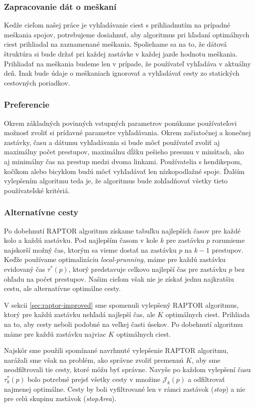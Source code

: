 \subsubsection{Zapracovanie dát o meškaní}
Kedže cieľom našej práce je vyhľadávanie ciest s prihliadnutím na prípadné meškania spojov, potrebujeme dosiahnuť, aby algoritmus pri hľadaní optimálnych ciest prihliadal na zaznamenané meškania. Spoliehame sa na to, že dátová štruktúra si bude držať pri každej zastávke v každej jazde hodnotu meškania. Prihliadať na meškania budeme len v prípade, že používateľ vyhľadáva v aktuálny deň. Inak bude údaje o meškaniach ignorovať a vyhľadávať cesty zo statických cestovných poriadkov.

\subsubsection{Preferencie}
Okrem základných povinných vstupných parametrov ponúkame používateľovi možnosť zvoliť si prídavné parametre vyhľadávania. Okrem začiatočnej a konečnej zastávky, času a dátumu vyhľadávania si bude môcť používateľ zvoliť aj maximálny počet prestupov, maximálnu dĺžku pešieho presunu v minútach, ako aj minimálny čas na prestup medzi dvoma linkami. Používatelia s hendikepom, kočíkom alebo bicyklom budú môcť vyhľadávať len nízkopodlažné spoje. Ďalším vylepšením algoritmu teda je, že algoritmus bude zohľadňovať všetky tieto používateľské kritériá. 

\subsubsection{Alternatívne cesty}
Po dobehnutí RAPTOR algoritmu získame tabuľku najlepších časov pre každé kolo a každú zastávku. Pod najlepším časom v kole $k$ pre zastávku $p$ rozumieme najskorší možný čas, ktorým sa vieme dostať na zastávku $p$ na $k-1$ prestupov. Keďže používame optimalizáciu \textit{local-prunning}, máme pre každú zastávku evidovaný čas $\tau^*(p)$, ktorý predstavuje celkovo najlepší čas pre zastávku $p$ bez ohľadu na počet prestupov. Našim cieľom však nie je získať jednu najkratšiu cestu, ale alternatívne optimálne cesty.

V sekcii \ref{sec:raptor-improved} sme spomenuli vylepšený RAPTOR algoritmus, ktorý pre každú zastávku nehľadá najlepší čas, ale $K$ optimálnych ciest. Prihliada na to, aby cesty neboli podobné na veľkej časti úsekov. Po dobehnutí algoritmu máme pre každú zastávku najviac $K$ optimálnych ciest.

Najskôr sme použili spomínané navrhnuté vylepšenie RAPTOR algoritmu, narážali sme však na problém, ako správne zvoliť premennú $K$, aby sme neodfiltrovali tie cesty, ktoré môžu byť správne. Navyše po každom vylepšení času $\tau^*_k(p)$ bolo potrebné prejsť všetky cesty v množine $\mathcal{J}_k(p)$ a odfiltrovať najmenej optimálne. Cesty by boli vyfiltrované len v rámci zastávok (\textit{stop}) a nie pre celú skupinu zastávok (\textit{stopArea}).

